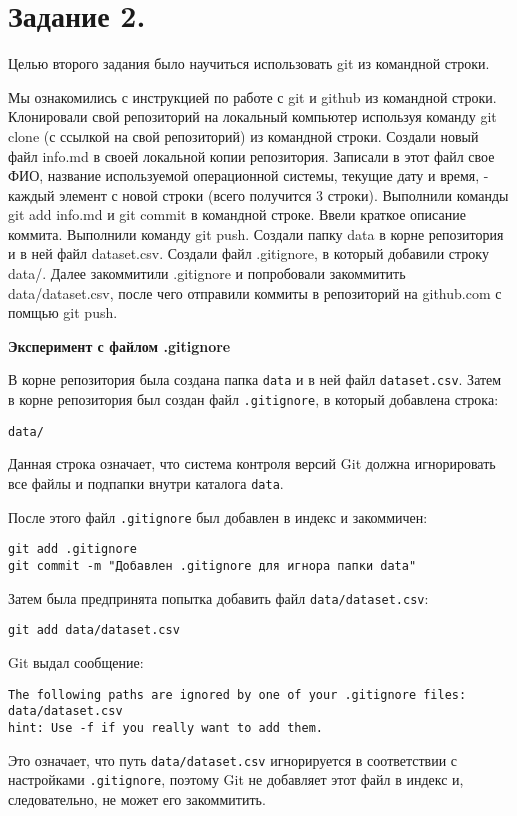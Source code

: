 \documentclass[12pt]{article}
\begin{document}
\section*{Задание 2.}
Целью второго задания было научиться использовать git из командной строки.

Мы ознакомились с инструкцией по работе с git и github из командной строки.
Клонировали свой репозиторий на локальный компьютер используя команду git clone (с ссылкой на свой репозиторий) из командной строки.
Создали новый файл info.md в своей локальной копии репозитория.
Записали в этот файл свое ФИО, название используемой операционной системы, текущие дату и время, - каждый элемент с новой строки (всего получится 3 строки).
Выполнили команды git add info.md и git commit в командной строке.
Ввели краткое описание коммита.
Выполнили команду git push.
Создали папку data в корне репозитория и в ней файл dataset.csv. Создали файл .gitignore, в который добавили строку data/. Далее закоммитили .gitignore и попробовали закоммитить data/dataset.csv, после чего отправили коммиты в репозиторий на github.com с помщью git push. 


\textbf{Эксперимент с файлом .gitignore}


В корне репозитория была создана папка \texttt{data} и в ней файл \texttt{dataset.csv}.
Затем в корне репозитория был создан файл \texttt{.gitignore}, в который добавлена строка:
\begin{lstlisting}
data/ 
\end{lstlisting}
Данная строка означает, что система контроля версий Git должна игнорировать
все файлы и подпапки внутри каталога \texttt{data}.

После этого файл \texttt{.gitignore} был добавлен в индекс и закоммичен:
\begin{lstlisting}
git add .gitignore
git commit -m "Добавлен .gitignore для игнора папки data"
\end{lstlisting}

Затем была предпринята попытка добавить файл \texttt{data/dataset.csv}:
\begin{lstlisting}
git add data/dataset.csv
\end{lstlisting}
\newpage
Git выдал сообщение:
\begin{lstlisting}
The following paths are ignored by one of your .gitignore files:
data/dataset.csv
hint: Use -f if you really want to add them.
\end{lstlisting}
Это означает, что путь \texttt{data/dataset.csv} игнорируется в соответствии
с настройками \texttt{.gitignore}, поэтому Git не добавляет этот файл в индекс
и, следовательно, не может его закоммитить.
\end{document}

